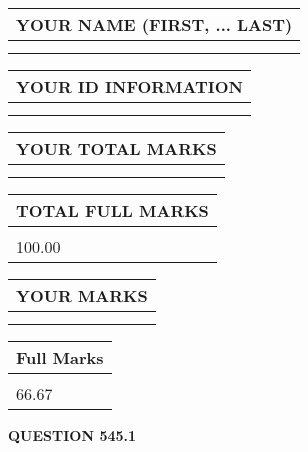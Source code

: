 \documentclass{ctexart}
\begin{document}
   
   
   
\newpage 
\setcounter{page}{ 
   545001 } 
   
   
   
   
\noindent\begin{tabular}{|l|}
\hline
YOUR NAME (FIRST, ... LAST)  \\
\hline
 \\ 
 \\ 
\hline
\end{tabular}
\hspace{0.05in} \begin{tabular}{|l|}
\hline
 YOUR   ID   INFORMATION  \\
\hline
 \\ 
 \\ 
\hline
\end{tabular}
   
   
\vspace{0.2in}\noindent\begin{tabular}{|l|}
\hline
YOUR TOTAL MARKS  \\
\hline
 \\ 
 \\ 
\hline
\end{tabular}
\hspace{0.05in} \begin{tabular}{|l|}
\hline
TOTAL FULL MARKS  \\
\hline
 \\ 
100.00 \\
\hline
\end{tabular}
   
   
 \vspace{0.2in}
 
 
 
 
   
   
  
\vspace{0.2in}
  
\noindent\begin{tabular}{|l|}
\hline
 YOUR MARKS  \\
\hline
 \\ 
 \\ 
\hline
\end{tabular}
\hspace{0.05in} \begin{tabular}{|l|}
\hline
 Full Marks  \\
\hline
 \\ 
66.67 \\
\hline
\end{tabular}
{\textbf{\Large{QUESTION
545.1 
}}}
  
\end{document}
